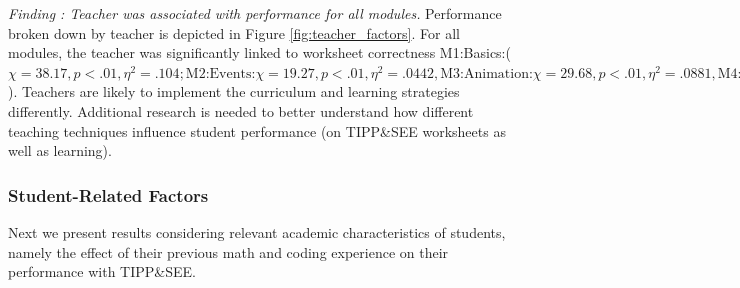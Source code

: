 \documentclass[sigconf,manuscript,review,anonymous]{acmart} %
\def\ts{TIPP\&SEE}
\begin{document}

\textit{Finding : Teacher was associated with performance for all modules.}
Performance broken down by teacher is depicted in Figure \ref{fig:teacher_factors}.  For all modules, the teacher was significantly linked to worksheet correctness M1:Basics:(\begin{math} \chi=38.17, p<.01, \eta^2=.104; \text{M2:Events:} \chi=19.27, p<.01, \eta^2=.0442, \text{M3:Animation:} \chi=29.68, p<.01, \eta^2=.0881, \text{M4:CondLoops} \chi=12.63, p<.01, \eta^2=.0350\end{math}). Teachers are likely to implement the curriculum and learning strategies differently. Additional research is needed to better understand how different teaching techniques influence student performance (on \ts{} worksheets as well as learning).


\subsubsection{Student-Related Factors} 
Next we present results considering relevant academic characteristics of students, namely the effect of their previous math and coding experience on their performance with \ts{}.
\end{document}

